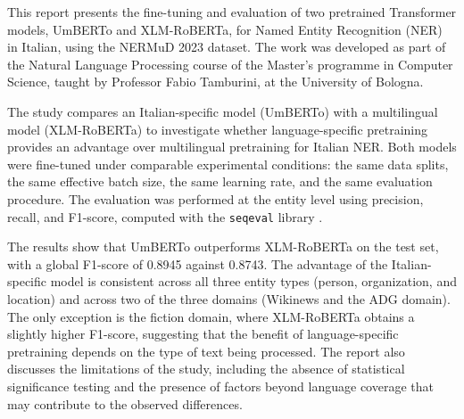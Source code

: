 This report presents the fine-tuning and evaluation of two pretrained Transformer models, UmBERTo and XLM-RoBERTa, for Named Entity Recognition (NER) in Italian, using the NERMuD 2023 dataset. The work was developed as part of the Natural Language Processing course of the Master's programme in Computer Science, taught by Professor Fabio Tamburini, at the University of Bologna.

The study compares an Italian-specific model (UmBERTo) with a multilingual model (XLM-RoBERTa) to investigate whether language-specific pretraining provides an advantage over multilingual pretraining for Italian NER. Both models were fine-tuned under comparable experimental conditions: the same data splits, the same effective batch size, the same learning rate, and the same evaluation procedure. The evaluation was performed at the entity level using precision, recall, and F1-score, computed with the \texttt{seqeval} library \cite{seqeval}.

The results show that UmBERTo outperforms XLM-RoBERTa on the test set, with a global F1-score of 0.8945 against 0.8743. The advantage of the Italian-specific model is consistent across all three entity types (person, organization, and location) and across two of the three domains (Wikinews and the ADG domain). The only exception is the fiction domain, where XLM-RoBERTa obtains a slightly higher F1-score, suggesting that the benefit of language-specific pretraining depends on the type of text being processed. The report also discusses the limitations of the study, including the absence of statistical significance testing and the presence of factors beyond language coverage that may contribute to the observed differences.